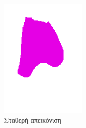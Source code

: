 \documentclass[a4paper,12pt]{article}
\begin{document}
\begin{figure}[H]
    \centering

    \begin{subfigure}[t]{0.4\linewidth}
    \includegraphics[width=\linewidth]{original_label_registration_3.png}
    \caption{Σταθερή απεικόνιση}
    \end{subfigure}
    \begin{subfigure}[t]{0.4\linewidth}

\end{subfigure}
\end{figure}
\end{document}
